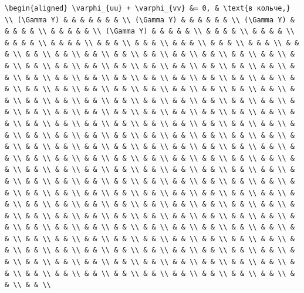 \documentclass[
  ukrainian,
]{article}
\begin{document}
\begin{verbatim}
\begin{aligned} \varphi_{uu} + \varphi_{vv} &= 0, & \text{в кольче,} \\ (\Gamma Y) & & & & & & & \\ (\Gamma Y) & & & & & & \\ (\Gamma Y) & & & & & \\ & & & & & \\ (\Gamma Y) & & & & & \\ & & & & \\ & & & & \\ & & & & \\ & & & & \\ & & & \\ & & & \\ & & & \\ & & & \\ & & & \\ & & & \\ & & \\ & & \\ & & \\ & & \\ & & \\ & & \\ & & \\ & & \\ & & \\ & & \\ & & \\ & & \\ & & \\ & & \\ & & \\ & & \\ & & \\ & & \\ & & \\ & & \\ & & \\ & & \\ & & \\ & & \\ & & \\ & & \\ & & \\ & & \\ & & \\ & & \\ & & \\ & & \\ & & \\ & & \\ & & \\ & & \\ & & \\ & & \\ & & \\ & & \\ & & \\ & & \\ & & \\ & & \\ & & \\ & & \\ & & \\ & & \\ & & \\ & & \\ & & \\ & & \\ & & \\ & & \\ & & \\ & & \\ & & \\ & & \\ & & \\ & & \\ & & \\ & & \\ & & \\ & & \\ & & \\ & & \\ & & \\ & & \\ & & \\ & & \\ & & \\ & & \\ & & \\ & & \\ & & \\ & & \\ & & \\ & & \\ & & \\ & & \\ & & \\ & & \\ & & \\ & & \\ & & \\ & & \\ & & \\ & & \\ & & \\ & & \\ & & \\ & & \\ & & \\ & & \\ & & \\ & & \\ & & \\ & & \\ & & \\ & & \\ & & \\ & & \\ & & \\ & & \\ & & \\ & & \\ & & \\ & & \\ & & \\ & & \\ & & \\ & & \\ & & \\ & & \\ & & \\ & & \\ & & \\ & & \\ & & \\ & & \\ & & \\ & & \\ & & \\ & & \\ & & \\ & & \\ & & \\ & & \\ & & \\ & & \\ & & \\ & & \\ & & \\ & & \\ & & \\ & & \\ & & \\ & & \\ & & \\ & & \\ & & \\ & & \\ & & \\ & & \\ & & \\ & & \\ & & \\ & & \\ & & \\ & & \\ & & \\ & & \\ & & \\ & & \\ & & \\ & & \\ & & \\ & & \\ & & \\ & & \\ & & \\ & & \\ & & \\ & & \\ & & \\ & & \\ & & \\ & & \\ & & \\ & & \\ & & \\ & & \\ & & \\ & & \\ & & \\ & & \\ & & \\ & & \\ & & \\ & & \\ & & \\ & & \\ & & \\ & & \\ & & \\ & & \\ & & \\ & & \\ & & \\ & & \\ & & \\ & & \\ & & \\ & & \\ & & \\ & & \\ & & \\ & & \\ & & \\ & & \\ & & \\
\end{verbatim}
\end{document}
